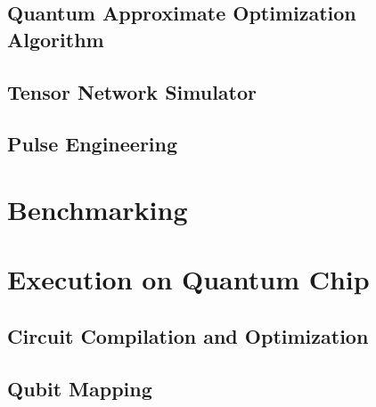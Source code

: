 \documentclass[pra,twocolumn,superscriptaddress,floatfix,nofootinbib,amsmath,amssymb]{revtex4-1}
\numberwithin{equation}{section}
\numberwithin{figure}{section}
\numberwithin{table}{section}
\begin{document}
\subsection{Quantum Approximate Optimization Algorithm}


\subsection{Tensor Network Simulator}


\subsection{Pulse Engineering}



\section{Benchmarking}
\label{sec:benchmark}



\section{Execution on Quantum Chip}
\label{sec:chip}
\subsection{Circuit Compilation and Optimization}


\subsection{Qubit Mapping}


% 

% 
\end{document}

